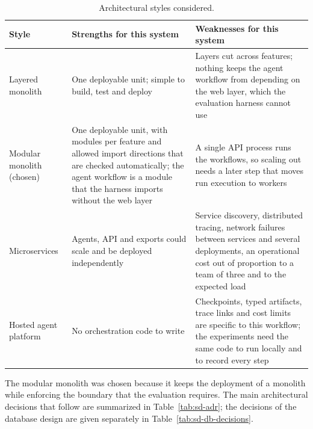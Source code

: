 \begin{table}[H]
    \centering
    \caption{Architectural styles considered.}
    \label{tab:sd-styles}
    \begin{tabularx}{\linewidth}{|p{2.6cm}|X|X|}
        \hline
        \textbf{Style} & \textbf{Strengths for this system} & \textbf{Weaknesses for this system} \\
        \hline
        Layered monolith & One deployable unit; simple to build, test and deploy & Layers cut across features; nothing keeps the agent workflow from depending on the web layer, which the evaluation harness cannot use \\
        \hline
        Modular monolith (chosen) & One deployable unit, with modules per feature and allowed import directions that are checked automatically; the agent workflow is a module that the harness imports without the web layer & A single API process runs the workflows, so scaling out needs a later step that moves run execution to workers \\
        \hline
        Microservices & Agents, API and exports could scale and be deployed independently & Service discovery, distributed tracing, network failures between services and several deployments, an operational cost out of proportion to a team of three and to the expected load \\
        \hline
        Hosted agent platform & No orchestration code to write & Checkpoints, typed artifacts, trace links and cost limits are specific to this workflow; the experiments need the same code to run locally and to record every step \\
        \hline
    \end{tabularx}
\end{table}

The modular monolith was chosen because it keeps the deployment of a monolith while enforcing the boundary that the evaluation requires. The main architectural decisions that follow are summarized in Table~\ref{tab:sd-adr}; the decisions of the database design are given separately in Table~\ref{tab:sd-db-decisions}.

